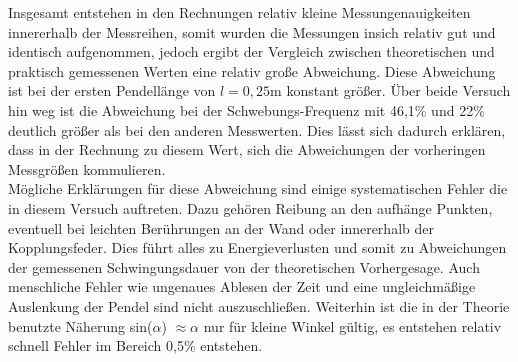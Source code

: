         \noindent Insgesamt entstehen in den Rechnungen relativ kleine Messungenauigkeiten innererhalb der Messreihen, somit wurden die 
        Messungen insich relativ gut und identisch aufgenommen, jedoch ergibt der Vergleich zwischen theoretischen und praktisch 
        gemessenen Werten eine relativ große Abweichung. Diese Abweichung ist bei der ersten Pendellänge von $l = 0,25 \si{\meter}$ 
        konstant größer. Über beide Versuch hin weg ist die Abweichung bei der Schwebungs-Frequenz mit 46,1\% und 22\% deutlich größer als bei 
        den anderen Messwerten. Dies lässt sich dadurch erklären, dass in der Rechnung zu diesem Wert, sich die Abweichungen der vorheringen 
        Messgrößen kommulieren.\\

        \noindent Mögliche Erklärungen für diese Abweichung sind einige systematischen Fehler die in diesem Versuch auftreten. Dazu gehören 
        Reibung an den aufhänge Punkten, eventuell bei leichten Berührungen an der Wand oder innererhalb der Kopplungsfeder. Dies führt 
        alles zu Energieverlusten und somit zu Abweichungen der gemessenen Schwingungsdauer von der theoretischen Vorhergesage. 
        Auch menschliche Fehler wie ungenaues Ablesen der Zeit und eine ungleichmäßige Auslenkung der Pendel sind nicht auszuschließen.
        Weiterhin ist die in der Theorie benutzte Näherung sin($\alpha$) $\approx \alpha$ nur für kleine Winkel gültig, es entstehen 
        relativ schnell Fehler im Bereich 0,5\% entstehen.

